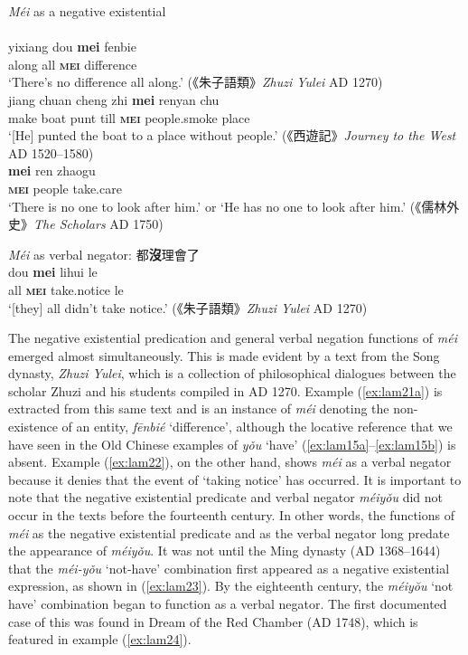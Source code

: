 \documentclass[output=paper,colorlinks,citecolor=brown,chinesefont]{langscibook}
\begin{document}
\ea \textit{Méi} as a negative existential \label{ex:lam21}\\
   \label{ex:lam21a}\\
  	\gll yixiang dou \textbf{mei} fenbie\\
  	along all \textbf{\textsc{mei}} difference\\
  	\glt `There's no difference all along.' ({\cn 《朱子語類》}\emph{Zhuzi Yulei} AD 1270)
   \label{ex:lam21b}\\
  	\gll jiang chuan cheng zhi \textbf{mei} renyan chu\\
  	make boat punt till \textbf{\textsc{mei}} people.smoke place\\
  	\glt `[He] punted the boat to a place without people.' ({\cn 《西遊記》}\emph{Journey to the West} AD 1520–1580)
   \label{ex:lam21c}\\
	\gll \textbf{mei} ren zhaogu\\
	\textbf{\textsc{mei}}	people	take.care\\
	\glt `There is no one to look after him.' or `He has no one to look after him.' ({\cn 《儒林外史》}\emph{The Scholars} AD 1750)
\z \z

\ea \textit{Méi} as verbal negator: {\cn 都\textbf{沒}理會了} \label{ex:lam22}\\
  \gll dou \textbf{mei} lihui le\\
  all \textbf{\textsc{mei}} take.notice le\\
  \glt `[they] all didn't take notice.' ({\cn 《朱子語類》}\emph{Zhuzi Yulei} AD 1270)
\z

The negative existential predication and general verbal negation functions of \textit{méi} emerged almost simultaneously. This is made evident by a text from the Song dynasty, \emph{Zhuzi Yulei}, which is a collection of philosophical dialogues between the scholar Zhuzi and his students compiled in AD 1270. Example (\ref{ex:lam21a}) is extracted from this same text and is an instance of \textit{méi} denoting the non-existence of an entity, \textit{fēnbié} `difference', although the locative reference that we have seen in the Old Chinese examples of \textit{yǒu} `have' (\ref{ex:lam15a}–\ref{ex:lam15b}) is absent. Example (\ref{ex:lam22}), on the other hand, shows \textit{méi} as a verbal negator because it denies that the event of `taking notice' has occurred. It is important to note that the negative existential predicate and verbal negator \textit{méiyǒu} did not occur in the texts before the fourteenth century. In other words, the functions of \textit{méi} as the negative existential predicate and as the verbal negator long predate the appearance of \textit{méiyǒu}. It was not until the Ming dynasty (AD 1368–1644) that the \textit{méi-yǒu} `not-have' combination first appeared as a negative existential expression, as shown in (\ref{ex:lam23}). By the eighteenth century, the \textit{méiyŏu} `not have' combination began to function as a verbal negator. The first documented case of this was found in Dream of the Red Chamber (AD 1748), which is featured in example (\ref{ex:lam24}). 
\end{document}

